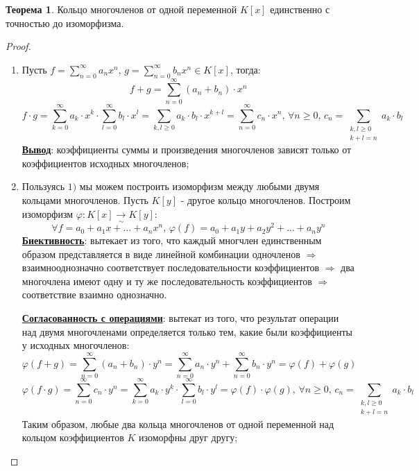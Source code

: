 \documentclass[12pt]{article}
\theoremstyle{definition}
\newtheorem{theorem}{Теорема}
\newcommand{\ddsum}[2]{\displaystyle\sum\limits_{#1}^{#2}}
\begin{document}
\begin{theorem}
	Кольцо многочленов от одной переменной $K[x]$  единственно с точностью до изоморфизма.
\end{theorem}
\begin{proof}\hfill
	\begin{enumerate}[label=\arabic*)]
		\item Пусть $f = \ddsum{n = 0}{\infty}a_nx^n, \, g = \ddsum{n = 0}{\infty}b_nx^n \in K[x]$, тогда:
		$$
			f + g = \ddsum{n = 0}{\infty}(a_n + b_n){\cdot}x^n
		$$
		$$
			f{\cdot}g = \ddsum{k = 0}{\infty}a_k{\cdot}x^k{\cdot}\ddsum{l = 0}{\infty}b_l{\cdot}x^l = \ddsum{k,l \geq 0}{}a_k{\cdot}b_l{\cdot}x^{k+l} = \ddsum{n = 0}{\infty}c_n{\cdot}x^n, \, \forall n \geq 0, \, c_n = \ddsum{\substack{k,l \geq 0\\k + l = n}}{}a_k{\cdot}b_l
		$$
		\textbf{\uline{Вывод}}: коэффициенты суммы и произведения многочленов зависят только от коэффициентов исходных многочленов;
		\item Пользуясь $1)$ мы можем построить изоморфизм между любыми двумя кольцами многочленов. Пусть $K[y]$ - другое кольцо многочленов. Построим изоморфизм $\varphi \colon K[x]\xrightarrow[\sim]{} K[y]$: 
		$$
			\forall f = a_0 + a_1 x + \dotsc + a_n x^n, \, \varphi(f) = a_0 + a_1y + a_2y^2 + \dotsc + a_ny^n
		$$
		\textbf{\uline{Биективность}}: вытекает из того, что каждый многчлен единственным образом представляется в виде линейной комбинации одночленов $\Rightarrow$ взаимнооднозначно соответствует последовательности коэффициентов $\Rightarrow$ два многочлена имеют одну и ту же последовательность коэффициентов $\Rightarrow$ соответствие взаимно однозначно.
		
		\textbf{\uline{Согласованность с операциями}}: вытекат из того, что результат операции над двумя многочленами определяется только тем, какие были коэффициенты у исходных многочленов:
		$$
			\varphi(f + g) = \ddsum{n = 0}{\infty}(a_n + b_n){\cdot}y^n = \ddsum{n = 0}{\infty}a_n{\cdot}y^n + \ddsum{n = 0}{\infty}b_n{\cdot}y^n = \varphi(f) + \varphi(g)
		$$
		$$
			\varphi(f{\cdot}g) = \ddsum{n = 0}{\infty}c_n{\cdot}y^n = \ddsum{k = 0}{\infty}a_k{\cdot}y^k{\cdot}\ddsum{l = 0}{\infty}b_l{\cdot}y^l  = \varphi(f){\cdot}\varphi(g), \, \forall n \geq 0, \, c_n = \ddsum{\substack{k,l \geq 0\\k + l = n}}{}a_k{\cdot}b_l
		$$
		Таким образом, любые два кольца многочленов от одной переменной над кольцом коэффициентов $K$ изоморфны друг другу;
	\end{enumerate}
\end{proof}
\end{document}
